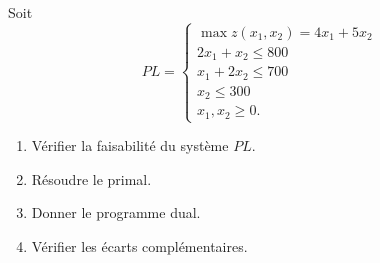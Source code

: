 \begin{td-exo} %
	Soit 
	\begin{equation*}
		PL = 
		\begin{cases}
			\max z(x_1,x_2) = 4x_1 + 5x_2\\
			2x_1 + x_2 \leq 800\\
			x_1 + 2x_2 \leq 700\\
			x_2 \leq 300\\
			x_1, x_2 \geq 0.
		\end{cases}
	\end{equation*}
	\begin{enumerate}
		\item Vérifier la faisabilité du système \(PL\).
		\item Résoudre le primal.
		\item Donner le programme dual.
		\item Vérifier les écarts complémentaires.
	\end{enumerate}
\end{td-exo}


